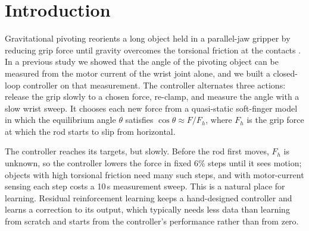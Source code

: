 \documentclass[11pt]{article}
\begin{document}
\section{Introduction}
Gravitational pivoting reorients a long object held in a parallel-jaw gripper by reducing grip force until gravity overcomes the torsional friction at the contacts \cite{holladay2015,vina2016,toskov2023}. In a previous study \cite{aidoo2026a} we showed that the angle of the pivoting object can be measured from the motor current of the wrist joint alone, and we built a closed-loop controller on that measurement. The controller alternates three actions: release the grip slowly to a chosen force, re-clamp, and measure the angle with a slow wrist sweep. It chooses each new force from a quasi-static soft-finger model in which the equilibrium angle $\theta$ satisfies $\cos\theta \approx F/F_h$, where $F_h$ is the grip force at which the rod starts to slip from horizontal.

The controller reaches its targets, but slowly. Before the rod first moves, $F_h$ is unknown, so the controller lowers the force in fixed 6\% steps until it sees motion; objects with high torsional friction need many such steps, and with motor-current sensing each step costs a 10\,s measurement sweep. This is a natural place for learning. Residual reinforcement learning \cite{johannink2019,silver2018} keeps a hand-designed controller and learns a correction to its output, which typically needs less data than learning from scratch and starts from the controller's performance rather than from zero.
\end{document}

